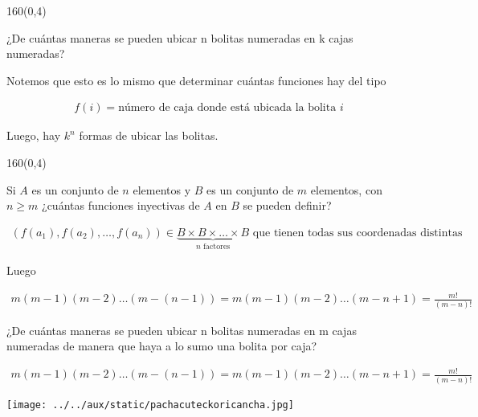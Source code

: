 \documentclass[shownotes,aspectratio=169]{beamer}
\newif\ifes
\newcommand{\es}[1]{\ifes#1\fi}
\begin{document}
\begin{frame}[plain]
 \begin{textblock}{160}(0,4)
 \centering \LARGE 
 \es{Bolitas numeradas en cajas numeradas}
 \end{textblock}
 \vspace{1cm}
 \centering
 
 ¿De cuántas maneras se pueden ubicar n bolitas numeradas en k cajas numeradas?
 
 \vspace{0.3cm}
 
 Notemos que esto es lo mismo que determinar cuántas funciones hay del tipo 
 
 \begin{align*}
  f(i) = \text{número de caja donde está ubicada la bolita } i
 \end{align*}
 
 Luego, hay $k^n$ formas de ubicar las bolitas.

 \end{frame}

 \begin{frame}[plain]
 \begin{textblock}{160}(0,4)
 \centering \LARGE 
 \es{Funciones inyectivas}
 \end{textblock}
 \vspace{1cm}
 \centering
 
 Si $A$ es un conjunto de $n$ elementos y $B$ es un conjunto de $m$ elementos, con $n \geq m$
¿cuántas funciones inyectivas de $A$ en $B$ se pueden definir?
 
\begin{align*}
 (f(a_1),f(a_2),\dots,f(a_n)) \in \underbrace{B \times B \times \dots \times B}_{n \text{ factores}} \text{ que tienen todas sus coordenadas distintas}
\end{align*}

Luego

\begin{align*}
 m(m-1)(m-2)\dots(m-(n-1)) = m(m-1)(m-2)\dots(m-n+1) = \frac{m!}{(m-n)!}
\end{align*}

 
 \end{frame}

 
 \begin{frame}[plain]
  
  ¿De cuántas maneras se pueden ubicar n bolitas numeradas en m cajas
numeradas de manera que haya a lo sumo una bolita por caja?


\begin{align*}
 m(m-1)(m-2)\dots(m-(n-1)) = m(m-1)(m-2)\dots(m-n+1) = \frac{m!}{(m-n)!}
\end{align*}

 \end{frame}


\begin{frame}[plain]
\centering
  \texttt{[image: ../../aux/static/pachacuteckoricancha.jpg]}
\end{frame}
\end{document}
